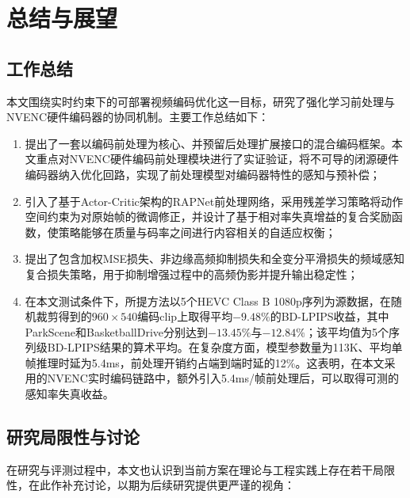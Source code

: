 \chapter{总结与展望}

\section{工作总结}

本文围绕实时约束下的可部署视频编码优化这一目标，研究了强化学习前处理与NVENC硬件编码器的协同机制。主要工作总结如下：

\begin{enumerate}
  \item 提出了一套以编码前处理为核心、并预留后处理扩展接口的混合编码框架。本文重点对NVENC硬件编码前处理模块进行了实证验证，将不可导的闭源硬件编码器纳入优化回路，实现了前处理模型对编码器特性的感知与预补偿；

  \item 引入了基于Actor-Critic架构的RAPNet前处理网络，采用残差学习策略将动作空间约束为对原始帧的微调修正，并设计了基于相对率失真增益的复合奖励函数，使策略能够在质量与码率之间进行内容相关的自适应权衡；

  \item 提出了包含加权MSE损失、非边缘高频抑制损失和全变分平滑损失的频域感知复合损失策略，用于抑制增强过程中的高频伪影并提升输出稳定性；

  \item 在本文测试条件下，所提方法以5个HEVC Class B 1080p序列为源数据，在随机裁剪得到的$960\times540$编码clip上取得平均$-9.48\%$的BD-LPIPS收益，其中ParkScene和BasketballDrive分别达到$-13.45\%$与$-12.84\%$；该平均值为5个序列级BD-LPIPS结果的算术平均。在复杂度方面，模型参数量为113K、平均单帧推理时延为5.4ms，前处理开销约占端到端时延的12\%。这表明，在本文采用的NVENC实时编码链路中，额外引入5.4ms/帧前处理后，可以取得可测的感知率失真收益。
\end{enumerate}

\section{研究局限性与讨论}

在研究与评测过程中，本文也认识到当前方案在理论与工程实践上存在若干局限性，在此作补充讨论，以期为后续研究提供更严谨的视角：

